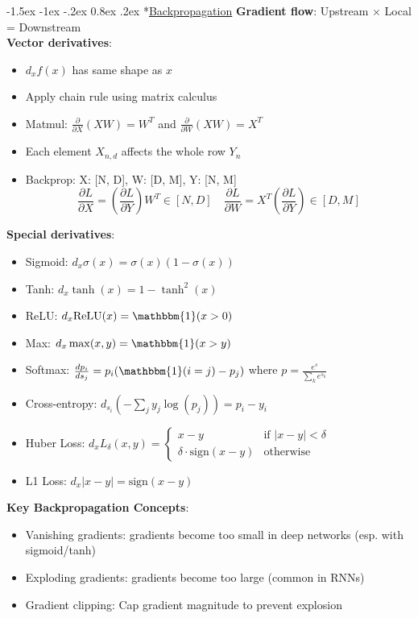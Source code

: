 \documentclass{article}
\makeatletter
\renewcommand\section{\@startsection{section}{1}{\z@}%
                                  {-1.5ex \@plus -1ex \@minus -.2ex}%
                                  {0.8ex \@plus.2ex}%
                                  {\normalfont\small\bfseries}}
\makeatother
\begin{document}
\begin{multicols}{3}
\section*{\underline{Backpropagation}}
\textbf{Gradient flow}: Upstream $\times$ Local = Downstream\\
\textbf{Vector derivatives}:
\begin{itemize}
\item $d_x f(x)$ has same shape as $x$
\item Apply chain rule using matrix calculus
\item Matmul: $\frac{\partial}{\partial X}(XW) = W^T$ and $\frac{\partial}{\partial W}(XW) = X^T$
\item Each element $X_{n,d}$ affects the whole row $Y_{n}$
\item Backprop: X: [N, D], W: [D, M], Y: [N, M]
$$\frac{\partial L}{\partial X} = \left(\frac{\partial L}{\partial Y}\right)W^T \in [N, D]  \quad\frac{\partial L}{\partial W} = X^T\left(\frac{\partial L}{\partial Y}\right) \in [D, M]$$
\end{itemize}
\textbf{Special derivatives}:
\begin{itemize}
\item Sigmoid: $d_x \sigma(x) = \sigma(x)(1-\sigma(x))$
\item Tanh: $d_x \tanh(x) = 1 - \tanh^2(x)$
\item ReLU: $d_x \text{ReLU}(x) = \mathbbm{1}(x > 0)$
\item Max: $d_x \max(x, y) = \mathbbm{1}(x > y)$
\item Softmax: $\frac{d p_i}{d s_j} = p_i(\mathbbm{1}(i=j) - p_j)$ where $p = \frac{e^{s}}{\sum_k e^{s_k}}$
\item Cross-entropy: $d_{s_i} \left(-\sum_j y_j\log(p_j)\right) = p_i - y_i$
\item Huber Loss: $d_x L_{\delta}(x,y) = \begin{cases} x-y & \text{if } |x-y| < \delta \\ \delta \cdot \text{sign}(x-y) & \text{otherwise} \end{cases}$
\item L1 Loss: $d_x |x-y| = \text{sign}(x-y)$
\end{itemize}

\textbf{Key Backpropagation Concepts}:
\begin{itemize}
\item Vanishing gradients: gradients become too small in deep networks (esp. with sigmoid/tanh)
\item Exploding gradients: gradients become too large (common in RNNs)
\item Gradient clipping: Cap gradient magnitude to prevent explosion
\end{itemize}


\end{multicols}
\end{document}
